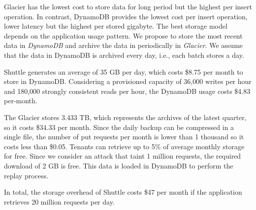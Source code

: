 Glacier has the lowest cost to store data for long period but the highest per insert operation. In contrast, DynamoDB provides the lowest cost per insert operation, lower latency but the highest per stored gigabyte. The best storage model depends on the application usage pattern. We propose to store the most recent data in \emph{DynamoDB} and archive the data in periodically in \emph{Glacier}. We assume that the data in DynamoDB is archived every day, i.e., each batch stores a day.

Shuttle generates an average of 35 GB per day, which costs \$8.75 per month to store in DynamoDB. Considering a provisioned capacity of 36,000 writes per hour and 180,000 strongly consistent reads per hour, the DynamoDB usage costs \$4.83 per-month.

The Glacier stores 3.433 TB, which represents the archives of the latest quarter, so it costs \$34.33 per month. Since the daily backup can be compressed in a single file, the number of put requests per month is lower than 1 thousand so it costs less than \$0.05. Tenants can retrieve up to 5\% of average monthly storage for free. Since we consider an attack that taint 1 million requests, the required download of 2 GB is free. This data is loaded in DynamoDB to perform the replay process. 

In total, the storage overhead of Shuttle costs \$47 per month if the application retrieves 20 million requests per day.\\



